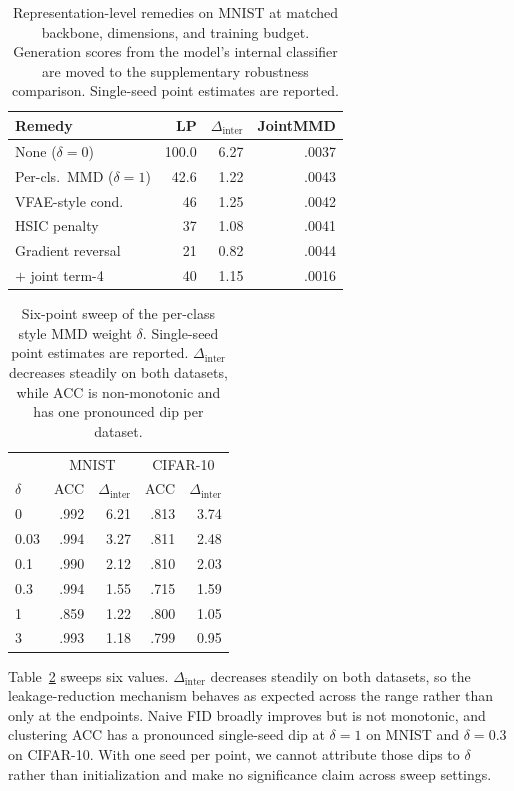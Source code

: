 \documentclass[letterpaper]{article}
\newcommand{\Dinter}{\Delta_{\mathrm{inter}}}
\begin{document}
\begin{table}[t]
\centering
\small
\setlength{\tabcolsep}{3.5pt}
\caption{Representation-level remedies on MNIST at matched backbone,
dimensions, and training budget. Generation scores from the model's internal
classifier are moved to the supplementary robustness comparison. Single-seed
point estimates are reported.}
\label{tab:invariance}
\scriptsize
\setlength{\tabcolsep}{2.5pt}
\begin{tabular}{lrrr}
\toprule
Remedy & LP & $\Dinter$ & JointMMD \\
\midrule
None ($\delta{=}0$) & 100.0 & 6.27 & .0037 \\
\midrule
Per-cls.\ MMD ($\delta{=}1$) & 42.6 & 1.22 & .0043 \\
{VFAE-style cond.} & 46 & 1.25 & .0042 \\
{HSIC penalty} & 37 & 1.08 & .0041 \\
{Gradient reversal} & 21 & 0.82 & .0044 \\
\midrule
{$+$ joint term-4} & 40 & 1.15 & .0016 \\
\bottomrule
\end{tabular}
\end{table}

\begin{table}[t]
\centering
\small
\setlength{\tabcolsep}{4pt}
\caption{Six-point sweep of the per-class style MMD weight $\delta$.
Single-seed point estimates are reported. $\Dinter$ decreases steadily on
both datasets, while ACC is non-monotonic and has one pronounced dip per
dataset.}
\label{tab:tradeoff}
\scriptsize
\setlength{\tabcolsep}{2.5pt}
\begin{tabular}{lrrrr}
\toprule
& \multicolumn{2}{c}{MNIST} & \multicolumn{2}{c}{CIFAR-10} \\
$\delta$ & ACC & $\Dinter$ & ACC & $\Dinter$ \\
\midrule
0     & .992 & 6.21 & .813 & 3.74 \\
0.03  & .994 & 3.27 & .811 & 2.48 \\
0.1   & .990 & 2.12 & .810 & 2.03 \\
0.3   & .994 & 1.55 & .715 & 1.59 \\
1     & .859 & 1.22 & .800 & 1.05 \\
3     & .993 & 1.18 & .799 & 0.95 \\
\bottomrule
\end{tabular}
\end{table}

Table~\ref{tab:tradeoff} sweeps six values. $\Dinter$ decreases steadily on
both datasets, so the leakage-reduction mechanism behaves as expected across
the range rather than only at the endpoints. Naive FID broadly improves but
is not monotonic, and clustering ACC has a pronounced single-seed dip at
$\delta{=}1$ on MNIST and $\delta{=}0.3$ on CIFAR-10. With one seed per
point, we cannot attribute those dips to $\delta$ rather than initialization
and make no significance claim across sweep settings.
\end{document}
